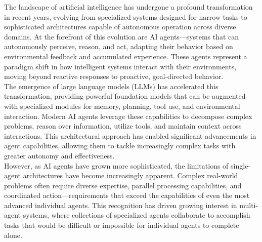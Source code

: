 The landscape of artificial intelligence has undergone a profound transformation in recent years, evolving from specialized systems designed for narrow tasks to sophisticated architectures capable of autonomous operation across diverse domains. At the forefront of this evolution are AI agents—systems that can autonomously perceive, reason, and act, adapting their behavior based on environmental feedback and accumulated experience. These agents represent a paradigm shift in how intelligent systems interact with their environments, moving beyond reactive responses to proactive, goal-directed behavior.\\ \newline
The emergence of large language models (LLMs) has accelerated this transformation, providing powerful foundation models that can be augmented with specialized modules for memory, planning, tool use, and environmental interaction. Modern AI agents leverage these capabilities to decompose complex problems, reason over information, utilize tools, and maintain context across interactions. This architectural approach has enabled significant advancements in agent capabilities, allowing them to tackle increasingly complex tasks with greater autonomy and effectiveness.\\ \newline
However, as AI agents have grown more sophisticated, the limitations of single-agent architectures have become increasingly apparent. Complex real-world problems often require diverse expertise, parallel processing capabilities, and coordinated action—requirements that exceed the capabilities of even the most advanced individual agents. This recognition has driven growing interest in multi-agent systems, where collections of specialized agents collaborate to accomplish tasks that would be difficult or impossible for individual agents to complete alone.\\
